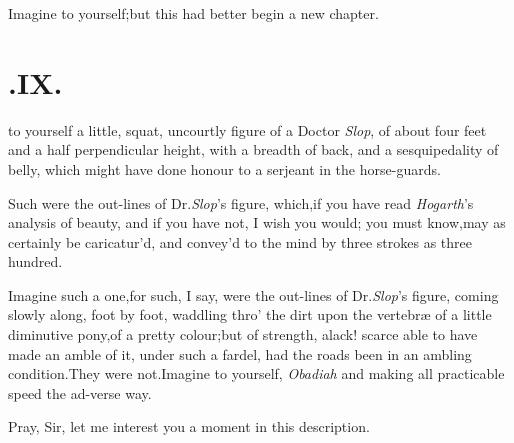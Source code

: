 \documentclass{article}
\begin{document}
Imagine to yourself;\tsk but this had better begin a new
chapter.


\null
\section{.\enspace  IX.}

 to yourself a little, squat, uncourtly figure of a Doctor
\textit{Slop}, of\break
about four feet and a half perpendicular
height, with a breadth of back, and a sesqui\-pedality of belly, which might have done honour to a serjeant in
the horse-guards.

Such were the out-lines of Dr.\@ \textit{Slop}’s figure, which,\tsk if you have read
\textit{Ho\-garth}’s analysis of beauty, and if you have not, I wish you would;\tsk
you must know,\break may as certainly be caricatur’d, and convey’d to the mind by three
strokes as three hundred.

Imagine such a one,\tsk for such, I say, were the out-lines of
Dr.\@ \textit{Slop}’s figure, coming slowly along, foot by foot,
waddling thro’ the dirt upon the vertebræ of a little
diminutive pony,\tsk of a pretty colour;\tsk but of strength,\tsk
alack!\tsh\break
scarce able to have made an amble of it,\break
under such a fardel, had the roads been
in an ambling condition.\tsh They were not.\tsh Imagine
to yourself, \textit{Obadiah}
and making all practicable speed the ad-\break verse way.

Pray, Sir, let me interest you a moment in this description.
\end{document}
